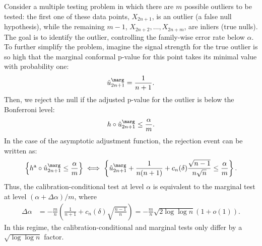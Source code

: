 Consider a multiple testing problem in which there are $m$ possible outliers to be tested: the first one of these data points, $X_{2n+1}$, is an outlier (a false null hypothesis), while the remaining $m-1$, $X_{2n+2},\ldots,X_{2n+m}$, are inliers (true nulls). The goal is to identify the outlier, controlling the family-wise error rate below $\alpha$. To further simplify the problem, imagine the signal strength for the true outlier is so high that the marginal conformal p-value for this point takes its minimal value with probability one:
\begin{align*}
\hat{u}^\marg_{2n+1} = \frac{1}{n+1}.
\end{align*}
Then, we reject the null if the adjusted p-value for the outlier is below the Bonferroni level:
\begin{align} \label{eq:power-needle-generic}
  h \circ \hat{u}^\marg_{2n+1} \leq \frac{\alpha}{m}.
\end{align}
In the case of the asymptotic adjustment function, the rejection event can be written as:
\begin{align*}
  \left\{ h^{\mathrm{a}} \circ \hat{u}^\marg_{2n+1} \leq \frac{\alpha}{m} \right\}
   \iff
   \left\{\hat{u}^\marg_{2n+1} + \frac{1}{n(n+1)} + c_n(\delta) \frac{\sqrt{n-1}}{n \sqrt{n}}  \leq \frac{\alpha}{m}\right\}.
\end{align*}
Thus, the calibration-conditional test at level $\alpha$ is equivalent to the marginal test at level $(\alpha + \Delta \alpha)/m$, where
\begin{align*}
  \Delta \alpha
  & = - \frac{m}{n} \left( \frac{1}{n+1} + c_n(\delta) \sqrt{\frac{n-1}{n}} \right)
    = - \frac{m}{n} \sqrt{2 \log \log n} (1 + o(1)).
\end{align*}
In this regime, the calibration-conditional and marginal tests only differ by a $\sqrt{\log\log n}$ factor.


